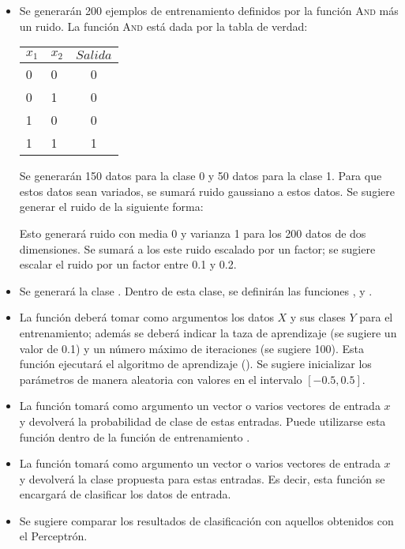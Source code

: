 \begin{itemize}
    \item Se generarán 200 ejemplos de entrenamiento definidos por la función \textsc{And} más un ruido. La función \textsc{And} está dada por la tabla de verdad:
    \begin{center}
        \begin{tabular}{ l l | c }
          $x_1$ & $x_2$ & $Salida$\\ \hline
          0 & 0  & 0 \\ \hline
          0 & 1 &  0  \\ \hline
          1 & 0 & 0  \\ \hline
          1 & 1 & 1  \\
        \end{tabular}
    \end{center}
    Se generarán 150 datos para la clase 0 y 50 datos para la clase 1. Para que estos datos sean variados, se sumará ruido gaussiano a estos datos. Se sugiere generar el ruido de la siguiente forma: 
    \begin{center}
    \end{center}
    Esto generará ruido con media 0 y varianza 1 para los 200 datos de dos dimensiones. Se sumará a los este ruido escalado por un factor; se sugiere escalar el ruido por un factor entre 0.1 y 0.2.

    \item Se generará la clase . Dentro de esta clase, se definirán las funciones ,  y .

    \item La función  deberá tomar como argumentos los datos $X$ y sus clases $Y$ para el entrenamiento; además se deberá indicar la taza de aprendizaje (se sugiere un valor de 0.1) y un número máximo de iteraciones (se sugiere 100). Esta función ejecutará el algoritmo de aprendizaje (). Se sugiere inicializar los parámetros de manera aleatoria con valores en el intervalo $[-0.5,0.5]$.

    \item La función  tomará como argumento un vector o varios vectores de entrada $x$ y devolverá la probabilidad de clase de estas entradas. Puede utilizarse esta función dentro de la función de entrenamiento .

    \item La función  tomará como argumento un vector o varios vectores de entrada $x$ y devolverá la clase propuesta para estas entradas. Es decir, esta función se encargará de clasificar los datos de entrada.

    \item Se sugiere comparar los resultados de clasificación con aquellos obtenidos con el Perceptrón. 
\end{itemize}


